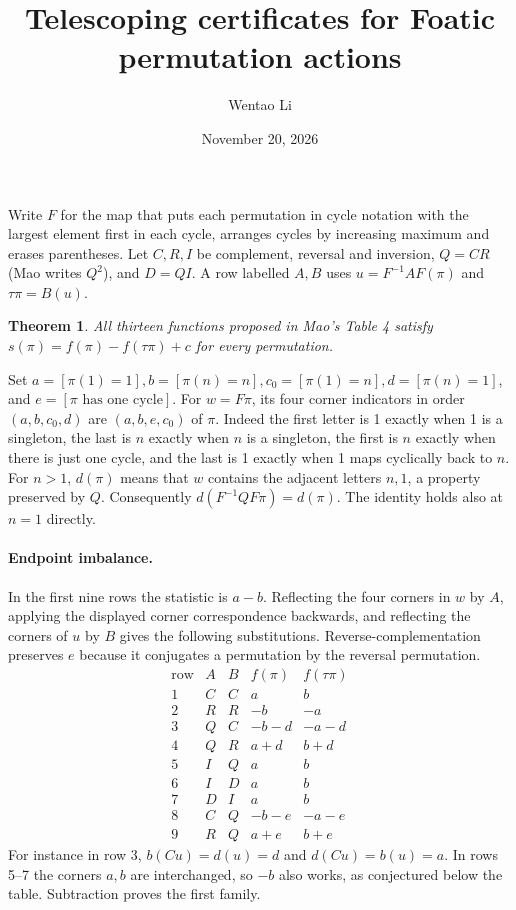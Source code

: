\documentclass[11pt]{article}
\title{Telescoping certificates for Foatic permutation actions}
\author{Wentao Li}
\date{November 20, 2026}
\newtheorem{theorem}{Theorem}
\begin{document}
\maketitle
Write $F$ for the map that puts each permutation in cycle notation with the largest element first in each cycle, arranges cycles by increasing maximum and erases parentheses. Let $C,R,I$ be complement, reversal and inversion, $Q=CR$ (Mao writes $Q^2$), and $D=QI$. A row labelled $A,B$ uses $u=F^{-1}AF(\pi)$ and $\tau\pi=B(u)$.
\begin{theorem}All thirteen functions proposed in Mao's Table 4 satisfy $s(\pi)=f(\pi)-f(\tau\pi)+c$ for every permutation.\end{theorem}
Set $a=[\pi(1)=1], b=[\pi(n)=n], c_0=[\pi(1)=n], d=[\pi(n)=1]$, and $e=[\pi\text{ has one cycle}]$. For $w=F\pi$, its four corner indicators in order $(a,b,c_0,d)$ are $(a,b,e,c_0)$ of $\pi$. Indeed the first letter is 1 exactly when 1 is a singleton, the last is $n$ exactly when $n$ is a singleton, the first is $n$ exactly when there is just one cycle, and the last is 1 exactly when 1 maps cyclically back to $n$. For $n>1$, $d(\pi)$ means that $w$ contains the adjacent letters $n,1$, a property preserved by $Q$. Consequently $d(F^{-1}QF\pi)=d(\pi)$. The identity holds also at $n=1$ directly.
\paragraph{Endpoint imbalance.} In the first nine rows the statistic is $a-b$. Reflecting the four corners in $w$ by $A$, applying the displayed corner correspondence backwards, and reflecting the corners of $u$ by $B$ gives the following substitutions. Reverse-complementation preserves $e$ because it conjugates a permutation by the reversal permutation.
\[
\begin{array}{c|cc|cc}
\text{row}&A&B& f(\pi)&f(\tau\pi)\\\hline
1&C&C&a&b\\
2&R&R&-b&-a\\
3&Q&C&-b-d&-a-d\\
4&Q&R&a+d&b+d\\
5&I&Q&a&b\\
6&I&D&a&b\\
7&D&I&a&b\\
8&C&Q&-b-e&-a-e\\
9&R&Q&a+e&b+e
\end{array}
\]
For instance in row 3, $b(Cu)=d(u)=d$ and $d(Cu)=b(u)=a$. In rows 5--7 the corners $a,b$ are interchanged, so $-b$ also works, as conjectured below the table. Subtraction proves the first family.
\end{document}
